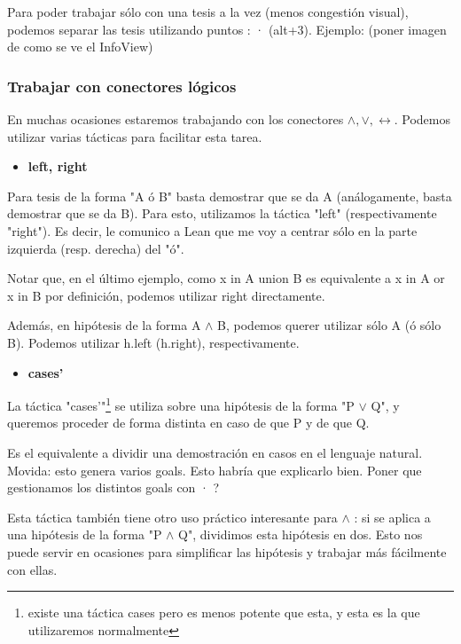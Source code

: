 \documentclass{article}
\begin{document}
Para poder trabajar sólo con una tesis a la vez (menos congestión visual), podemos separar las tesis utilizando puntos : · (alt+3). Ejemplo: (poner imagen de como se ve el InfoView)

\subsubsection{Trabajar con conectores lógicos}

En muchas ocasiones estaremos trabajando con los conectores $\land, \lor, \leftrightarrow$. Podemos utilizar varias tácticas para facilitar esta tarea.

\begin{itemize}
    \item \textbf{left, right}
\end{itemize}

Para tesis de la forma "A ó B" basta demostrar que se da A (análogamente, basta demostrar que se da B). Para esto, utilizamos la táctica "left" (respectivamente "right"). Es decir, le comunico a Lean que me voy a centrar sólo en la parte izquierda (resp. derecha) del "ó".


Notar que, en el último ejemplo, como x in A union B es equivalente a x in A or x in B por definición, podemos utilizar right directamente.

Además, en hipótesis de la forma A $\land$ B, podemos querer utilizar sólo A (ó sólo B). Podemos utilizar h.left (h.right), respectivamente.

\begin{itemize}
    \item \textbf{cases'}
\end{itemize}

La táctica "cases'"\footnote{existe una táctica cases pero es menos potente que esta, y esta es la que utilizaremos normalmente} se utiliza sobre una hipótesis de la forma "P $\lor$ Q", y queremos proceder de forma distinta en caso de que P y de que Q.

Es el equivalente a dividir una demostración en casos en el lenguaje natural. Movida: esto genera varios goals. Esto habría que explicarlo bien. Poner que gestionamos los distintos goals con · ?

Esta táctica también tiene otro uso práctico interesante para $\land$ : si se aplica a una hipótesis de la forma "P $\land$ Q", dividimos esta hipótesis en dos. Esto nos puede servir en ocasiones para simplificar las hipótesis y trabajar más fácilmente con ellas.
\end{document}
